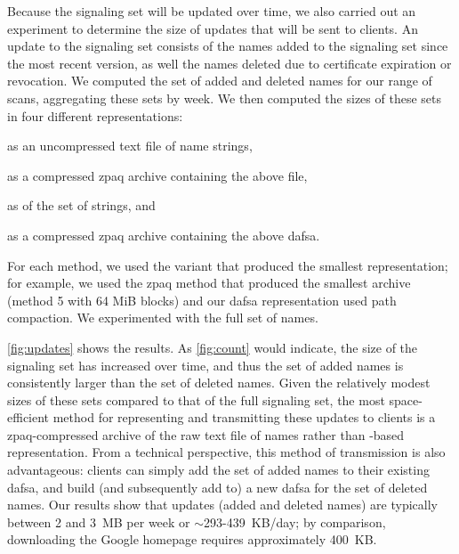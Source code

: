 Because the signaling set will be updated over time, we also carried out an
experiment to determine the size of updates that will be sent to clients. 
An update to the signaling set consists of the names added to the signaling
set since the most recent version, as well the names 
deleted due to certificate expiration or revocation. We computed the set of
added and deleted names for our range of scans, aggregating these sets by week.
We then computed the sizes of these sets in four different representations:
\begin{inparaenum}[(1)]
\item as an uncompressed text file of name strings,
\item as a compressed zpaq archive containing the above file,
\item as  of the set of strings, and
\item as a compressed zpaq archive containing the above \ac{dafsa}.
\end{inparaenum}
For each method, we used the variant that produced the smallest representation;
for example, we used the zpaq method that produced the smallest archive (method
5 with 64 MiB blocks) and our \ac{dafsa} representation used path compaction.
We experimented with the full set of names.

\autoref{fig:updates} shows the results. As
\autoref{fig:count} would indicate, the size of the signaling set has increased
over time, and thus the set of added names is consistently larger than the set
of deleted names. Given the relatively modest sizes of these sets compared to
that of the full signaling set, the most space-efficient method for representing
and transmitting these updates to clients is a zpaq-compressed archive
of the raw text file of names rather than -based representation. From
a technical perspective, this method of transmission is also advantageous:
clients can simply add the set of added names to their existing \ac{dafsa}, and
build (and subsequently add to) a new \ac{dafsa} for the set of deleted names.
Our results show that updates (added and deleted names) are typically between 2
and 3~MB per week or $\sim$293-439~KB/day; by comparison, downloading the Google
homepage requires approximately 400~KB.


